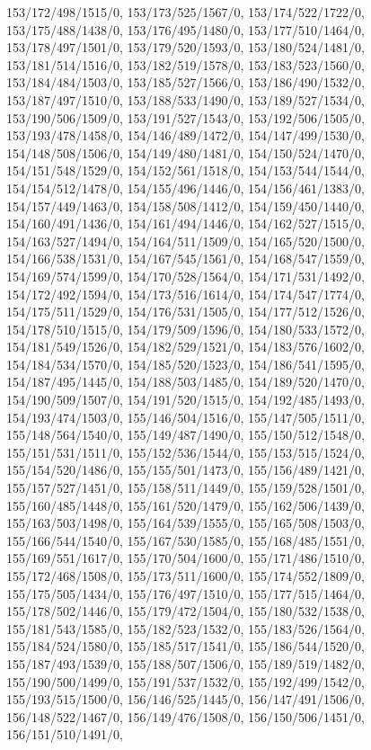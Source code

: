 {153/172/498/1515/0,%
153/173/525/1567/0,%
153/174/522/1722/0,%
153/175/488/1438/0,%
153/176/495/1480/0,%
153/177/510/1464/0,%
153/178/497/1501/0,%
153/179/520/1593/0,%
153/180/524/1481/0,%
153/181/514/1516/0,%
153/182/519/1578/0,%
153/183/523/1560/0,%
153/184/484/1503/0,%
153/185/527/1566/0,%
153/186/490/1532/0,%
153/187/497/1510/0,%
153/188/533/1490/0,%
153/189/527/1534/0,%
153/190/506/1509/0,%
153/191/527/1543/0,%
153/192/506/1505/0,%
153/193/478/1458/0,%
154/146/489/1472/0,%
154/147/499/1530/0,%
154/148/508/1506/0,%
154/149/480/1481/0,%
154/150/524/1470/0,%
154/151/548/1529/0,%
154/152/561/1518/0,%
154/153/544/1544/0,%
154/154/512/1478/0,%
154/155/496/1446/0,%
154/156/461/1383/0,%
154/157/449/1463/0,%
154/158/508/1412/0,%
154/159/450/1440/0,%
154/160/491/1436/0,%
154/161/494/1446/0,%
154/162/527/1515/0,%
154/163/527/1494/0,%
154/164/511/1509/0,%
154/165/520/1500/0,%
154/166/538/1531/0,%
154/167/545/1561/0,%
154/168/547/1559/0,%
154/169/574/1599/0,%
154/170/528/1564/0,%
154/171/531/1492/0,%
154/172/492/1594/0,%
154/173/516/1614/0,%
154/174/547/1774/0,%
154/175/511/1529/0,%
154/176/531/1505/0,%
154/177/512/1526/0,%
154/178/510/1515/0,%
154/179/509/1596/0,%
154/180/533/1572/0,%
154/181/549/1526/0,%
154/182/529/1521/0,%
154/183/576/1602/0,%
154/184/534/1570/0,%
154/185/520/1523/0,%
154/186/541/1595/0,%
154/187/495/1445/0,%
154/188/503/1485/0,%
154/189/520/1470/0,%
154/190/509/1507/0,%
154/191/520/1515/0,%
154/192/485/1493/0,%
154/193/474/1503/0,%
155/146/504/1516/0,%
155/147/505/1511/0,%
155/148/564/1540/0,%
155/149/487/1490/0,%
155/150/512/1548/0,%
155/151/531/1511/0,%
155/152/536/1544/0,%
155/153/515/1524/0,%
155/154/520/1486/0,%
155/155/501/1473/0,%
155/156/489/1421/0,%
155/157/527/1451/0,%
155/158/511/1449/0,%
155/159/528/1501/0,%
155/160/485/1448/0,%
155/161/520/1479/0,%
155/162/506/1439/0,%
155/163/503/1498/0,%
155/164/539/1555/0,%
155/165/508/1503/0,%
155/166/544/1540/0,%
155/167/530/1585/0,%
155/168/485/1551/0,%
155/169/551/1617/0,%
155/170/504/1600/0,%
155/171/486/1510/0,%
155/172/468/1508/0,%
155/173/511/1600/0,%
155/174/552/1809/0,%
155/175/505/1434/0,%
155/176/497/1510/0,%
155/177/515/1464/0,%
155/178/502/1446/0,%
155/179/472/1504/0,%
155/180/532/1538/0,%
155/181/543/1585/0,%
155/182/523/1532/0,%
155/183/526/1564/0,%
155/184/524/1580/0,%
155/185/517/1541/0,%
155/186/544/1520/0,%
155/187/493/1539/0,%
155/188/507/1506/0,%
155/189/519/1482/0,%
155/190/500/1499/0,%
155/191/537/1532/0,%
155/192/499/1542/0,%
155/193/515/1500/0,%
156/146/525/1445/0,%
156/147/491/1506/0,%
156/148/522/1467/0,%
156/149/476/1508/0,%
156/150/506/1451/0,%
156/151/510/1491/0,%
}
